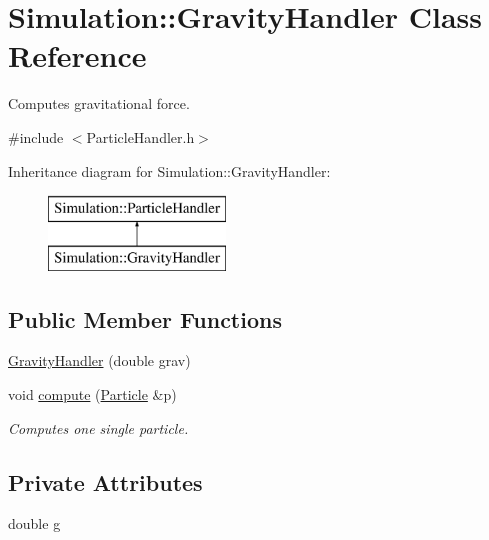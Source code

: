 \hypertarget{classSimulation_1_1GravityHandler}{\section{Simulation\-:\-:Gravity\-Handler Class Reference}
\label{classSimulation_1_1GravityHandler}
}


Computes gravitational force.  




{\ttfamily \#include $<$Particle\-Handler.\-h$>$}

Inheritance diagram for Simulation\-:\-:Gravity\-Handler\-:\begin{figure}[H]
\begin{center}
\leavevmode
\includegraphics[height=2.000000cm]{classSimulation_1_1GravityHandler}
\end{center}
\end{figure}
\subsection*{Public Member Functions}
\begin{DoxyCompactItemize}
\item 
\hyperlink{classSimulation_1_1GravityHandler_aa7a255d6fca3bb50ad2e76c521eda322}{Gravity\-Handler} (double grav)
\item 
void \hyperlink{classSimulation_1_1GravityHandler_a7f5b0d36e4e8e3dd6eb54d364add0287}{compute} (\hyperlink{classSimulation_1_1Particle}{Particle} \&p)
\begin{DoxyCompactList}\small\item\em Computes one single particle. \end{DoxyCompactList}\end{DoxyCompactItemize}
\subsection*{Private Attributes}
\begin{DoxyCompactItemize}
\item 
double \hyperlink{classSimulation_1_1GravityHandler_ad4a9911ae16b09fb2be6d50424efbeee}{g}
\end{DoxyCompactItemize}


